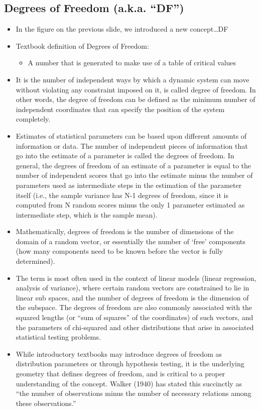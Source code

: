\documentclass[]{article}
\begin{document}
\subsection{Degrees of Freedom (a.k.a.
``DF'')}\label{degrees-of-freedom-a.k.a.-df}

\begin{itemize}
\itemsep1pt\parskip0pt
\item
  In the figure on the previous slide, we introduced a new
  concept\ldots{}DF
\item
  Textbook definition of Degrees of Freedom:

  \begin{itemize}
  \itemsep1pt\parskip0pt
  \item
    A number that is generated to make use of a table of critical values
  \end{itemize}
\item
  It is the number of independent ways by which a dynamic system can
  move without violating any constraint imposed on it, is called degree
  of freedom. In other words, the degree of freedom can be defined as
  the minimum number of independent coordinates that can specify the
  position of the system completely.
\item
  Estimates of statistical parameters can be based upon different
  amounts of information or data. The number of independent pieces of
  information that go into the estimate of a parameter is called the
  degrees of freedom. In general, the degrees of freedom of an estimate
  of a parameter is equal to the number of independent scores that go
  into the estimate minus the number of parameters used as intermediate
  steps in the estimation of the parameter itself (i.e., the sample
  variance has N-1 degrees of freedom, since it is computed from N
  random scores minus the only 1 parameter estimated as intermediate
  step, which is the sample mean).
\item
  Mathematically, degrees of freedom is the number of dimensions of the
  domain of a random vector, or essentially the number of `free'
  components (how many components need to be known before the vector is
  fully determined).
\item
  The term is most often used in the context of linear models (linear
  regression, analysis of variance), where certain random vectors are
  constrained to lie in linear sub spaces, and the number of degrees of
  freedom is the dimension of the subspace. The degrees of freedom are
  also commonly associated with the squared lengths (or ``sum of
  squares'' of the coordinates) of such vectors, and the parameters of
  chi-squared and other distributions that arise in associated
  statistical testing problems.
\item
  While introductory textbooks may introduce degrees of freedom as
  distribution parameters or through hypothesis testing, it is the
  underlying geometry that defines degrees of freedom, and is critical
  to a proper understanding of the concept. Walker (1940) has stated
  this succinctly as ``the number of observations minus the number of
  necessary relations among these observations.''
\end{itemize}
\end{document}
